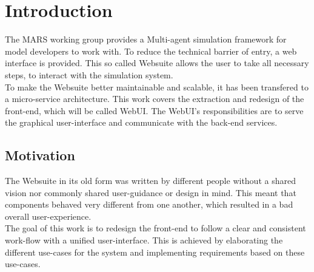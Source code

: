 
\chapter{Introduction}
The MARS working group provides a Multi-agent simulation framework for model developers to work with. To reduce the technical barrier of entry, a web interface is provided. This  so called Websuite allows the user to take all necessary steps, to interact with the simulation system.\\
To make the Websuite better maintainable and scalable, it has been transfered to a micro-service architecture. This work covers the extraction and redesign of the front-end, which will be called WebUI. The WebUI's responsibilities are to serve the graphical user-interface and communicate with the back-end services.


\section{Motivation}
The Websuite in its old form was written by different people without a shared vision nor commonly shared user-guidance or design in mind. This meant that components behaved very different from one another, which resulted in a bad overall user-experience.\\
The goal of this work is to redesign the front-end to follow a clear and consistent work-flow with a unified user-interface. This is achieved by elaborating the different use-cases for the system and implementing requirements based on these use-cases.